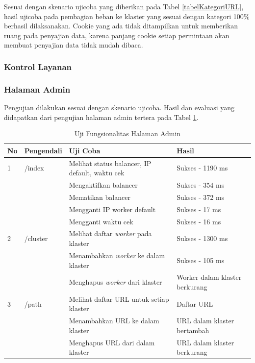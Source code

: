 \documentclass{ta-its}
\begin{document}
					Sesuai dengan skenario ujicoba yang diberikan pada Tabel \ref{tabelKategoriURL}, hasil ujicoba pada pembagian beban ke klaster yang sesuai dengan kategori 100\% berhasil dilaksanakan. Cookie yang ada tidak ditampilkan untuk memberikan ruang pada penyajian data, karena panjang cookie setiap permintaan akan membuat penyajian data tidak mudah dibaca.
									
				\subsubsection{Kontrol Layanan}
					
				
				\subsubsection{Halaman Admin}
					Pengujian dilakukan sesuai dengan skenario ujicoba. Hasil dan evaluasi yang didapatkan dari pengujian halaman admin tertera pada Tabel \ref{tabelUjiFungsionalitasHasil}.
					
					\begin{longtable}{|p{}|p{}|p{}|p{}|} %
						
						\caption{Uji Fungsionalitas Halaman Admin} \label{tabelUjiFungsionalitasHasil} \\
						\hline
						\textbf{No} & \textbf{Pengendali} & \textbf{Uji Coba} & \textbf{Hasil} \\ \hline
						
						\endhead
						\endfoot
						\endlastfoot
						
						
						1 & /index & Melihat status balancer, IP default, waktu cek & Sukses - 1190 ms \\ \cline{3-4}
						&& Mengaktifkan	balancer & Sukses - 354 ms \\ \cline{3-4}
						&& Mematikan balancer & Sukses - 372 ms \\ \cline{3-4}
						&& Mengganti IP worker default & Sukses - 17 ms \\ \cline{3-4}
						&& Mengganti waktu cek & Sukses - 16 ms \\ \hline
						2 & /cluster & Melihat daftar \textit{worker} pada klaster & Sukses - 1300 ms \\ \cline{3-4}
						&& Menambahkan \textit{worker} ke dalam klaster & Sukses - 105 ms \\ \cline{3-4}
						&& Menghapus \textit{worker} dari klaster & Worker dalam klaster berkurang \\ \hline
						3 & /path & Melihat daftar URL untuk setiap klaster & Daftar URL \\ \cline{3-4}
						&& Menambahkan URL ke dalam klaster & URL dalam klaster bertambah \\ \cline{3-4}
						&& Menghapus URL dari dalam klaster & URL dalam klaster berkurang \\ \hline
						
					\end{longtable}
					
\end{document}
